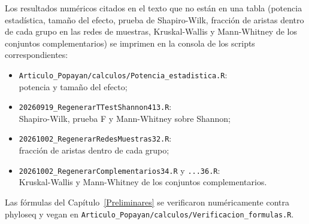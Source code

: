 Los resultados numéricos citados en el texto que no están en una tabla (potencia estadística,
tamaño del efecto, prueba de Shapiro-Wilk, fracción de aristas dentro de cada grupo en las redes
de muestras, Kruskal-Wallis y Mann-Whitney de los conjuntos complementarios) se imprimen en la
consola de los scripts correspondientes:
\begin{itemize}
\item \texttt{Articulo\_Popayan/calculos/Potencia\_estadistica.R}:\\ potencia y tamaño del efecto;
\item \texttt{20260919\_RegenerarTTestShannon413.R}:\\ Shapiro-Wilk, prueba F y Mann-Whitney sobre Shannon;
\item \texttt{20261002\_RegenerarRedesMuestras32.R}:\\ fracción de aristas dentro de cada grupo;
\item \texttt{20261002\_RegenerarComplementarios34.R} y \texttt{...36.R}:\\ Kruskal-Wallis y Mann-Whitney de los conjuntos complementarios.
\end{itemize}
Las fórmulas del Capítulo~\ref{Preliminares} se verificaron numéricamente contra phyloseq y vegan
en \texttt{Articulo\_Popayan/calculos/Verificacion\_formulas.R}.
